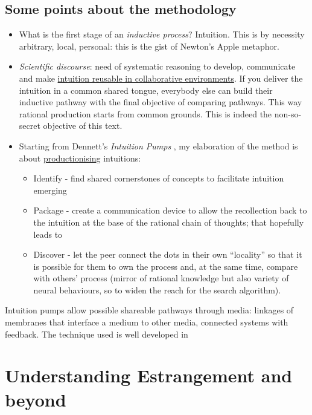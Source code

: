 \documentclass[14pt,a4paper]{extarticle}
\begin{document}
\subsection*{Some points about the methodology}
\label{subsec:methodology}
\begin{itemize}
\item What is the first stage of an \textit{inductive process}? Intuition. This is by necessity arbitrary, local, personal: this is the gist of Newton’s Apple metaphor.
\item \textit{Scientific discourse}: need of systematic reasoning to develop, communicate and make \underline{intuition reusable in collaborative environments}. If you deliver the intuition in a common shared tongue, everybody else can build their inductive pathway with the final objective of comparing pathways. This way rational production starts from common grounds. This is indeed the non-so-secret objective of this text.
\item Starting from Dennett’s \textit{Intuition Pumps} \cite{dennett2014intuition}, my elaboration of the method is about \underline{productionising} intuitions:
	\begin{itemize}
\item Identify - find shared cornerstones of concepts to facilitate intuition emerging
\item Package - create a communication device to allow the recollection back to the intuition at the base of the rational chain of thoughts; that hopefully leads to
\item Discover - let the peer connect the dots in their own “locality” so that it is possible for them to own the process and, at the same time, compare with others’ process (mirror of rational knowledge but also variety of neural behaviours, so to widen the reach for the search algorithm).
	\end{itemize}
\end{itemize}
\hspace*{15mm}Intuition pumps allow possible shareable pathways through media: linkages of membranes that interface a medium to other media, connected systems with feedback. The technique used is well developed in \cite{dennett2017bacteria,dennett2008kinds}

\section*{Understanding Estrangement and beyond}
\label{subsec:enstrangement}
\end{document}
